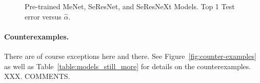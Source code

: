 \begin{figure}[!htb]
{      \label{fig:shufflenet-small}
   }
   \caption{
      Pre-trained 
      MeNet, SeResNet, and SeResNeXt
      Models.
      Top 1 Test error versus
      $\hat{\alpha}$.
           }
   \label{fig:still_more_2}
\end{figure}


\paragraph{Counterexamples.}
There are of course exceptions here and there.
See
Figure~\ref{fig:counter-examples}
as well as 
Table~\ref{table:models_still_more}
for details on the counterexamples.
XXX.  COMMENTS.


